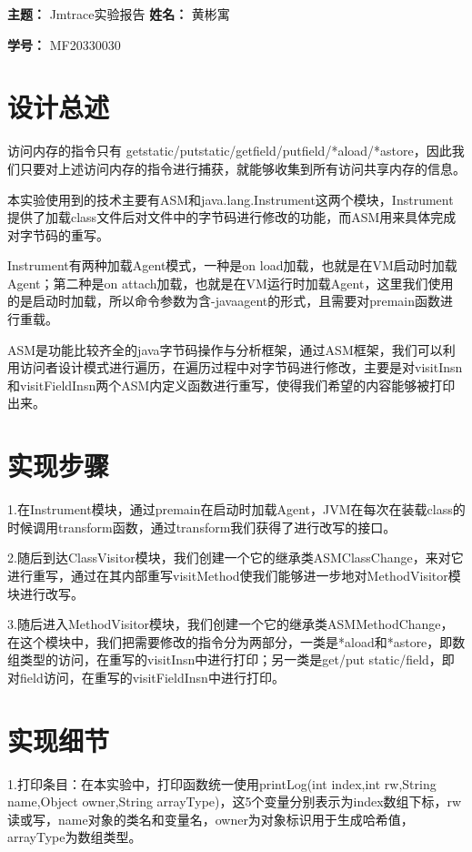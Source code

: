 \documentclass[UTF8]{article}
\begin{document}
    
{\flushleft \bf \Large 主题：} Jmtrace实验报告
{\flushleft \bf \Large 姓名：} 黄彬寓

{\flushleft \bf \Large 学号：} MF20330030




    
\section{设计总述}
访问内存的指令只有 getstatic/putstatic/getfield/putfield/*aload/*astore，因此我们只要对上述访问内存的指令进行捕获，就能够收集到所有访问共享内存的信息。

本实验使用到的技术主要有ASM和java.lang.Instrument这两个模块，Instrument提供了加载class文件后对文件中的字节码进行修改的功能，而ASM用来具体完成对字节码的重写。

Instrument有两种加载Agent模式，一种是on load加载，也就是在VM启动时加载Agent；第二种是on attach加载，也就是在VM运行时加载Agent，这里我们使用的是启动时加载，所以命令参数为含-javaagent的形式，且需要对premain函数进行重载。

ASM是功能比较齐全的java字节码操作与分析框架，通过ASM框架，我们可以利用访问者设计模式进行遍历，在遍历过程中对字节码进行修改，主要是对visitInsn和visitFieldInsn两个ASM内定义函数进行重写，使得我们希望的内容能够被打印出来。


\section{实现步骤}
1.在Instrument模块，通过premain在启动时加载Agent，JVM在每次在装载class的时候调用transform函数，通过transform我们获得了进行改写的接口。

2.随后到达ClassVisitor模块，我们创建一个它的继承类ASMClassChange，来对它进行重写，通过在其内部重写visitMethod使我们能够进一步地对MethodVisitor模块进行改写。

3.随后进入MethodVisitor模块，我们创建一个它的继承类ASMMethodChange，在这个模块中，我们把需要修改的指令分为两部分，一类是*aload和*astore，即数组类型的访问，在重写的visitInsn中进行打印；另一类是get/put static/field，即对field访问，在重写的visitFieldInsn中进行打印。

\section{实现细节}
1.打印条目：在本实验中，打印函数统一使用printLog(int index,int rw,String name,Object owner,String arrayType)，这5个变量分别表示为index数组下标，rw读或写，name对象的类名和变量名，owner为对象标识用于生成哈希值，arrayType为数组类型。
 
\end{document}
